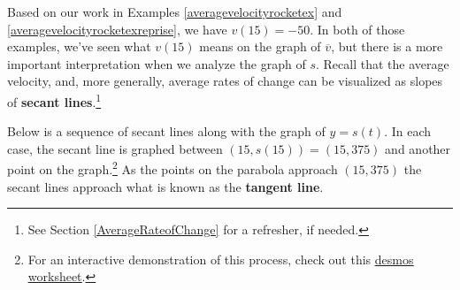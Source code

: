 \documentclass{ximera}
\begin{document}

\medskip

Based on our work in Examples \ref{averagevelocityrocketex}   and \ref{averagevelocityrocketexreprise}, we have  $v(15) = -50$.   In both of those examples, we've seen what $v(15)$ means on the graph of $\overline{v}$, but there is a more important interpretation when we analyze the graph of $s$.  Recall that the average velocity, and, more generally, average rates of change can be visualized as slopes of \textbf{secant lines}.\footnote{See Section \ref{AverageRateofChange} for a refresher, if needed.}  

\medskip

Below is a sequence of secant lines along with the graph of $y = s(t)$.  In each case, the secant line is graphed between $(15, s(15)) = (15, 375)$ and another point on the graph.\footnote{For an interactive demonstration of this process, check out this \href{https://www.desmos.com/calculator/mbqfpe4cmh}{\underline{desmos worksheet}}.} As the points on the parabola approach $(15, 375)$ the secant lines approach what is known as the \textbf{tangent line}.

\medskip
\end{document}
